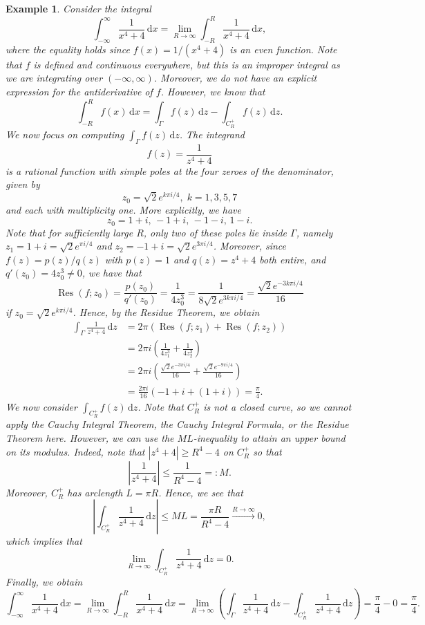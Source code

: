 \documentclass[10pt]{article}
\newcommand{\dd}{\,\mathrm{d}}
\DeclareMathOperator{\Res}{Res}
\theoremstyle{newstyle}
\newtheorem{exmp}[thm]{Example}
\begin{document}
\begin{exmp}
Consider the integral 
\[ \int_{-\infty}^\infty \frac{1}{x^4+4}\dd x = \lim_{R\to\infty} \int_{-R}^R \frac{1}{x^4+4}\dd x, \]
where the equality holds since $f(x) = 1/(x^4+4)$ is an even function. Note that $f$ is 
defined and continuous everywhere, but this is an improper integral as we are integrating over 
$(-\infty, \infty)$. Moreover, we do not have an explicit expression for the antiderivative of $f$. 
However, we know that 
\[ \int_{-R}^R f(x)\dd x = \int_\Gamma f(z)\dd z - \int_{C_R^+} f(z)\dd z. \]
We now focus on computing $\int_\Gamma f(z)\dd z$. The integrand 
\[ f(z) = \frac{1}{z^4+4} \]
is a rational function with simple poles at the four zeroes of the denominator, given by 
\[ z_0 = \sqrt2 e^{k\pi i/4},\; k = 1, 3, 5, 7 \]
and each with multiplicity one. More explicitly, we have 
\[ z_0 = 1+i,\, -1+i,\, -1-i,\, 1-i. \]
Note that for sufficiently large $R$, only two of these poles lie inside $\Gamma$, namely 
$z_1 = 1+i = \sqrt2 e^{\pi i/4}$ and $z_2 = -1+i = \sqrt2 e^{3\pi i/4}$. 
Moreover, since $f(z) = p(z)/q(z)$ with $p(z) = 1$ and $q(z) = z^4+4$ both entire, and 
$q'(z_0) = 4z_0^3 \neq 0$, we have that 
\[ \Res(f; z_0) = \frac{p(z_0)}{q'(z_0)} = \frac{1}{4z_0^3} = 
\frac{1}{8\sqrt2 e^{3k\pi i/4}} = \frac{\sqrt2 e^{-3k\pi i/4}}{16} \]
if $z_0 = \sqrt2e^{k\pi i/4}$. Hence, by the Residue Theorem, we obtain 
\begin{align*}
    \int_\Gamma \frac{1}{z^4+4}\dd z 
    &= 2\pi (\Res(f; z_1) + \Res(f; z_2)) \\
    &= 2\pi i \left( \frac{1}{4z_1^3} + \frac{1}{4z_2^3} \right) \\
    &= 2\pi i \left( \frac{\sqrt2 e^{-3\pi i/4}}{16} + \frac{\sqrt2 e^{-9\pi i/4}}{16} \right) \\
    &= \frac{2\pi i}{16} (-1+i + (1+i)) = \frac\pi4. 
\end{align*}
We now consider $\int_{C_R^+} f(z)\dd z$. Note that $C_R^+$ is not a closed curve, so we cannot 
apply the Cauchy Integral Theorem, the Cauchy Integral Formula, or the Residue Theorem here. 
However, we can use the $ML$-inequality to attain an upper bound on its modulus. Indeed, note that 
$|z^4 + 4| \geq R^4 - 4$ on $C_R^+$ so that 
\[ \left| \frac{1}{z^4+4} \right| \leq \frac{1}{R^4 - 4} =: M. \]
Moreover, $C_R^+$ has arclength $L = \pi R$. Hence, we see that 
\[ \left| \int_{C_R^+} \frac{1}{z^4+4}\dd z \right| \leq ML = \frac{\pi R}{R^4 - 4} 
\xrightarrow[]{R\to\infty} 0, \]
which implies that 
\[ \lim_{R\to\infty} \int_{C_R^+} \frac{1}{z^4+4}\dd z = 0. \]
Finally, we obtain 
\[ \int_{-\infty}^\infty \frac{1}{x^4+4}\dd x 
= \lim_{R\to\infty} \int_{-R}^R \frac{1}{x^4+4}\dd x 
= \lim_{R\to\infty} \left( \int_\Gamma \frac{1}{z^4+4}\dd z - \int_{C_R^+} \frac{1}{z^4+4}\dd z 
\right) = \frac\pi4 - 0 = \frac\pi4. \]
\end{exmp}
\end{document}
